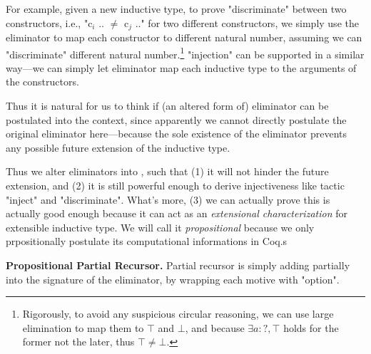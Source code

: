 For example, given a new inductive type, to prove "discriminate" between two constructors, i.e., "c$_i$ .. $\neq$ c$_j$ .." for two different constructors, we simply use the eliminator to map each constructor to different natural number, assuming we can "discriminate" different natural number.\footnote{Rigorously, to avoid any suspicious circular reasoning, we can use large elimination to map them to $\top$ and $\bot$, and because $\exists a : ?, \top$ holds for the former not the later, thus $\top \neq \bot$.} "injection" can be supported in a similar way---we can simply let eliminator map each inductive type to the arguments of the constructors. 

Thus it is natural for us to think if (an altered form of) eliminator can be postulated into the context, since apparently we cannot directly postulate the original eliminator here---because the sole existence of the eliminator prevents any possible future extension of the inductive type. 

Thus we alter eliminators into , such that (1) it will not hinder the future extension, and (2) it is still powerful enough to derive injectiveness like tactic "inject" and "discriminate". What's more, (3) we can actually prove this  is actually good enough because it can act as an \textit{extensional characterization} for extensible inductive type. We will call it \textit{propositional} because we only prpositionally postulate its computational informations in Coq.s

\textbf{Propositional Partial Recursor.} Partial recursor is simply adding partially into the signature of the eliminator, by wrapping each motive with "option". 

